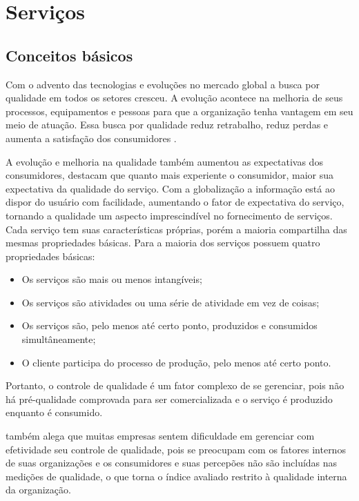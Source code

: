 \chapter[Serviços]{Serviços}

\section{Conceitos básicos}

Com o advento das tecnologias e evoluções no mercado global a busca por qualidade em todos os setores cresceu. A evolução acontece na melhoria de seus processos, equipamentos e pessoas para que a organização tenha vantagem em seu meio de atuação. Essa busca por qualidade reduz retrabalho, reduz perdas e aumenta a satisfação dos consumidores \cite[p.~150]{slack2002}.

A evolução e melhoria na qualidade também aumentou as expectativas dos consumidores, \cite [p.~42]{parasuraman1991} destacam que quanto mais experiente o consumidor, maior sua expectativa da qualidade do serviço. Com a globalização a informação está ao dispor do usuário com facilidade, aumentando o fator de expectativa do serviço, tornando a qualidade um aspecto imprescindível no fornecimento de serviços. Cada serviço tem suas características próprias, porém a maioria compartilha das mesmas propriedades básicas. Para  a maioria dos serviços possuem quatro propriedades básicas:
\begin{itemize}
	\item Os serviços são mais ou menos intangíveis;
	\item Os serviços são atividades ou uma série de atividade em vez de coisas;
	\item Os serviços são, pelo menos até certo ponto, produzidos e consumidos simultâneamente;
	\item O cliente participa do processo de produção, pelo menos até certo ponto.
\end{itemize}


Portanto, o controle de qualidade é um fator complexo de se gerenciar, pois não há pré-qualidade comprovada para ser comercializada e o serviço é produzido enquanto é consumido.

\cite[p.~47]{gronroos1993} também alega que muitas empresas sentem dificuldade em gerenciar com efetividade seu controle de qualidade, pois se preocupam com os fatores internos de suas organizações e os consumidores e suas percepões não são incluídas nas medições de qualidade, o que torna o índice avaliado restrito à qualidade interna da organização.

